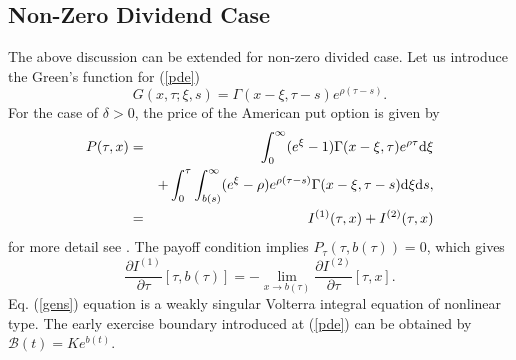 \documentclass[fleqn,final,3p,11pt]{elsarticle}
\theoremstyle{definition}
\theoremstyle{remark}
\numberwithin{equation}{section}
\begin{document}
\begin{appendices}
\subsection{Non-Zero Dividend Case}
The above discussion can be extended for non-zero divided case. Let us introduce the Green's function for (\ref{pde})
\[ G(x, \tau; \xi,s) = \Gamma(x-\xi, \tau-s)e^{\rho(\tau-s)}.  \]
 For the case of $\delta >0 $, the price of the American put option is given by
 \begin{eqnarray}
  P(\tau, x) & = & \int_{0}^{\infty} (e^{\xi} - 1)\Gamma(x-\xi, \tau) e^{\rho \tau} \mathrm{d}\xi  \\\notag
& & + \int_{0}^{\tau}\int_{b(s)}^{\infty} ( e^{\xi} - \rho) e^{\rho (\tau-s)} \Gamma(x-\xi, \tau-s) \mathrm{d}\xi \mathrm{d}s,  \\\notag
& =&  I^{(1)}(\tau, x) + I^{(2)}(\tau, x)
\end{eqnarray}
  for more detail see \cite{evans}. The payoff condition implies $P_{\tau}( \tau, b(\tau)) = 0$, which gives
  \begin{equation}\label{gens}
   \frac{\partial I^{(1)}}{\partial \tau} [\tau, b(\tau)] = - \lim_{x\rightarrow b(\tau)} \frac{\partial I^{(2)}}{\partial \tau} [\tau,x].
\end{equation}
Eq. (\ref{gens}) equation is a weakly singular Volterra integral equation of nonlinear type.
The early exercise boundary introduced at (\ref{pde}) can be obtained by $\mathcal{B}(t) = K e^{b(t)}$.

\end{appendices}
\end{document}
